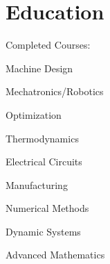 \documentclass[]{deedy-resume-openfont}
\begin{document}
%
%


%
%






\sectionsep
\section{Education}

\vspace{\topsep} %
Completed Courses:
\begin{minipage}[t]{.25\textwidth}
\begin{tightemize}
\item Machine Design
\item Mechatronics/Robotics
\item Optimization
\end{tightemize}
\end{minipage}
%
\begin{minipage}[t]{.25\textwidth}
\begin{tightemize}
\item Thermodynamics
\item Electrical Circuits
\item Manufacturing
\end{tightemize}
\end{minipage}
%
\begin{minipage}[t]{.25\textwidth}
\begin{tightemize}
\item Numerical Methods
\item Dynamic Systems
\item Advanced Mathematics
\end{tightemize}
\end{minipage}

\vspace{1 em}

\end{document}
